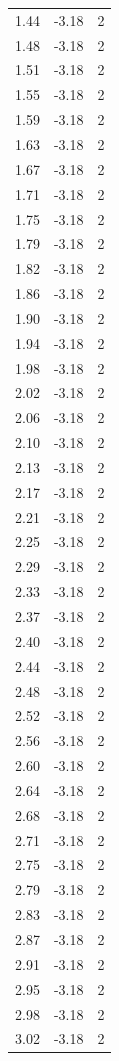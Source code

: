 \begin{longtable}{lrr}
  1.44 & -3.18 & 2 \\
  1.48 & -3.18 & 2 \\
  1.51 & -3.18 & 2 \\
  1.55 & -3.18 & 2 \\
  1.59 & -3.18 & 2 \\
  1.63 & -3.18 & 2 \\
  1.67 & -3.18 & 2 \\
  1.71 & -3.18 & 2 \\
  1.75 & -3.18 & 2 \\
  1.79 & -3.18 & 2 \\
  1.82 & -3.18 & 2 \\
  1.86 & -3.18 & 2 \\
  1.90 & -3.18 & 2 \\
  1.94 & -3.18 & 2 \\
  1.98 & -3.18 & 2 \\
  2.02 & -3.18 & 2 \\
  2.06 & -3.18 & 2 \\
  2.10 & -3.18 & 2 \\
  2.13 & -3.18 & 2 \\
  2.17 & -3.18 & 2 \\
  2.21 & -3.18 & 2 \\
  2.25 & -3.18 & 2 \\
  2.29 & -3.18 & 2 \\
  2.33 & -3.18 & 2 \\
  2.37 & -3.18 & 2 \\
  2.40 & -3.18 & 2 \\
  2.44 & -3.18 & 2 \\
  2.48 & -3.18 & 2 \\
  2.52 & -3.18 & 2 \\
  2.56 & -3.18 & 2 \\
  2.60 & -3.18 & 2 \\
  2.64 & -3.18 & 2 \\
  2.68 & -3.18 & 2 \\
  2.71 & -3.18 & 2 \\
  2.75 & -3.18 & 2 \\
  2.79 & -3.18 & 2 \\
  2.83 & -3.18 & 2 \\
  2.87 & -3.18 & 2 \\
  2.91 & -3.18 & 2 \\
  2.95 & -3.18 & 2 \\
  2.98 & -3.18 & 2 \\
  3.02 & -3.18 & 2 \\

\end{longtable}
